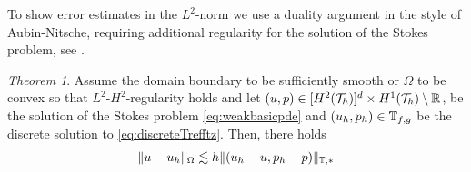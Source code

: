 \documentclass[sn-mathphys,Numbered]{sn-jnl}%
\theoremstyle{remark}%
\newtheorem{theorem}{Theorem}%
\theoremstyle{definition}%
\begin{document}
To show error estimates in the $L^2$-norm we use a duality argument in the style of Aubin-Nitsche, requiring additional regularity for the solution of the Stokes problem, see \cite{10.3792/pjaa.67.171}.

\begin{theorem}
  Assume the domain boundary to be sufficiently smooth or $\Omega$ to be convex so that $L^2$-$H^2$-regularity holds and let $(u,p) \in [H^{2}({\mathcal{T}_h})]^d \times H^{1}({\mathcal{T}_h}) \setminus \mathbb{R}$, be the solution of the Stokes problem \eqref{eq:weakbasicpde} and $(u_h,p_h) \in \mathbb{T}_{f,g}$ be the discrete solution to \eqref{eq:discreteTrefftz}. Then, there holds
  \begin{equation}
    \Vert u-u_h \Vert_{\Omega} \lesssim h \Vert (u_h-u,p_h-p) \Vert_{\mathbb{T},\ast}
  \end{equation}
\end{theorem}
\end{document}
